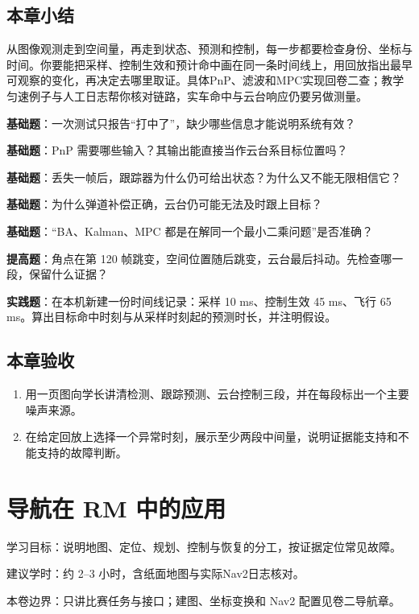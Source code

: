 \documentclass[
  lang=cn,
  scheme=chinese,
  chinesefont=ctexfont,
  11pt,
  oneside,
  device=normal,
  color=cyan,
  mode=fancy
]{elegantbook}
\begin{document}
\section{本章小结}
\begin{conclusion}
从图像观测走到空间量，再走到状态、预测和控制，每一步都要检查身份、坐标与时间。你要能把采样、控制生效和预计命中画在同一条时间线上，用回放指出最早可观察的变化，再决定去哪里取证。具体PnP、滤波和MPC实现回卷二查；教学匀速例子与人工日志帮你核对链路，实车命中与云台响应仍要另做测量。
\end{conclusion}

\begin{problemset}
\item \label{v3-prob-aim-1}\textbf{基础题}：一次测试只报告“打中了”，缺少哪些信息才能说明系统有效？
\item \label{v3-prob-aim-2}\textbf{基础题}：PnP 需要哪些输入？其输出能直接当作云台系目标位置吗？
\item \label{v3-prob-aim-3}\textbf{基础题}：丢失一帧后，跟踪器为什么仍可给出状态？为什么又不能无限相信它？
\item \label{v3-prob-aim-4}\textbf{基础题}：为什么弹道补偿正确，云台仍可能无法及时跟上目标？
\item \label{v3-prob-aim-5}\textbf{基础题}：“BA、Kalman、MPC 都是在解同一个最小二乘问题”是否准确？
\item \label{v3-prob-aim-6}\textbf{提高题}：角点在第 120 帧跳变，空间位置随后跳变，云台最后抖动。先检查哪一段，保留什么证据？
\item \label{v3-prob-aim-7}\textbf{实践题}：在本机新建一份时间线记录：采样 10 ms、控制生效 45 ms、飞行 65 ms。算出目标命中时刻与从采样时刻起的预测时长，并注明假设。
\end{problemset}

\section{本章验收}
\begin{enumerate}
  \item 用一页图向学长讲清检测、跟踪预测、云台控制三段，并在每段标出一个主要噪声来源。
  \item 在给定回放上选择一个异常时刻，展示至少两段中间量，说明证据能支持和不能支持的故障判断。
\end{enumerate}

\chapter{导航在 RM 中的应用}
\begin{introduction}
  \item 学习目标：说明地图、定位、规划、控制与恢复的分工，按证据定位常见故障。
  \item 建议学时：约 2--3 小时，含纸面地图与实际Nav2日志核对。
  \item 本卷边界：只讲比赛任务与接口；建图、坐标变换和 Nav2 配置见卷二导航章。
\end{introduction}
\label{ch:v3-nav}
\end{document}
